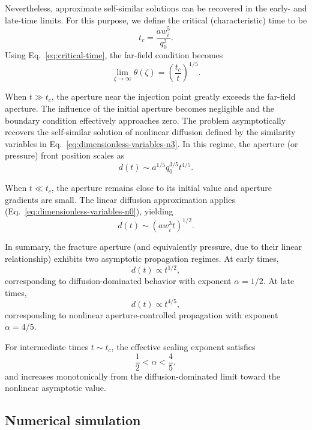\documentclass[draft]{agujournal2019}
\begin{document}
Nevertheless, approximate self-similar solutions can be recovered in the early- and late-time limits. For this purpose, we define the critical (characteristic) time to be
\begin{equation}
	t_c = \frac{a w_i^5}{q_0^2}.
	\label{eq:critical-time}
\end{equation}
Using Eq.~\ref{eq:critical-time}, the far-field condition becomes
\begin{equation}
	\lim_{\zeta \to \infty} \theta(\zeta)
	= \left( \frac{t_c}{t} \right)^{1/5}.
	\label{eq:critical-time-boundary-condition}
\end{equation}

When $t \gg t_c$, the aperture near the injection point greatly exceeds the far-field aperture. The influence of the initial aperture becomes negligible and the boundary condition effectively approaches zero. The problem asymptotically recovers the self-similar solution of nonlinear diffusion defined by the similarity variables in Eq.~\ref{eq:dimensionless-variables-n3}. In this regime, the aperture (or pressure) front position scales as
\begin{equation}
	d(t) \sim a^{1/5} q_0^{3/5} t^{4/5}.
	\label{eq:late-time-scaling}
\end{equation}

When $t \ll t_c$, the aperture remains close to its initial value and aperture gradients are small. The linear diffusion approximation applies (Eq.~\ref{eq:dimensionless-variables-n0}), yielding
\begin{equation}
	d(t) \sim (a w_i^3 t)^{1/2}.
	\label{eq:early-time-scaling}
\end{equation}

In summary, the fracture aperture (and equivalently pressure, due to their linear relationship) exhibits two asymptotic propagation regimes. At early times,
\[
d(t) \propto t^{1/2},
\]
corresponding to diffusion-dominated behavior with exponent $\alpha = 1/2$. At late times,
\[
d(t) \propto t^{4/5},
\]
corresponding to nonlinear aperture-controlled propagation with exponent $\alpha = 4/5$.

For intermediate times $t \sim t_c$, the effective scaling exponent satisfies
\[
\frac{1}{2} < \alpha < \frac{4}{5},
\]
and increases monotonically from the diffusion-dominated limit toward the nonlinear asymptotic value.


\subsection{Numerical simulation}
\end{document}
